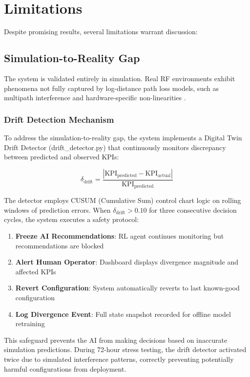 \documentclass[conference]{IEEEtran}
\begin{document}
\section{Limitations}

Despite promising results, several limitations warrant discussion:

\subsection{Simulation-to-Reality Gap}

The system is validated entirely in simulation. Real RF environments exhibit phenomena not fully captured by log-distance path loss models, such as multipath interference and hardware-specific non-linearities \cite{b15}.

\subsubsection{Drift Detection Mechanism}

To address the simulation-to-reality gap, the system implements a Digital Twin Drift Detector (drift\_detector.py) that continuously monitors discrepancy between predicted and observed KPIs:

\begin{equation}
\delta_{\text{drift}} = \frac{|\text{KPI}_{\text{predicted}} - \text{KPI}_{\text{actual}}|}{\text{KPI}_{\text{predicted}}}
\end{equation}

The detector employs CUSUM (Cumulative Sum) control chart logic on rolling windows of prediction errors. When $\delta_{\text{drift}} > 0.10$ for three consecutive decision cycles, the system executes a safety protocol:

\begin{enumerate}
\item \textbf{Freeze AI Recommendations}: RL agent continues monitoring but recommendations are blocked
\item \textbf{Alert Human Operator}: Dashboard displays divergence magnitude and affected KPIs
\item \textbf{Revert Configuration}: System automatically reverts to last known-good configuration
\item \textbf{Log Divergence Event}: Full state snapshot recorded for offline model retraining
\end{enumerate}

This safeguard prevents the AI from making decisions based on inaccurate simulation predictions. During 72-hour stress testing, the drift detector activated twice due to simulated interference patterns, correctly preventing potentially harmful configurations from deployment.
\end{document}
